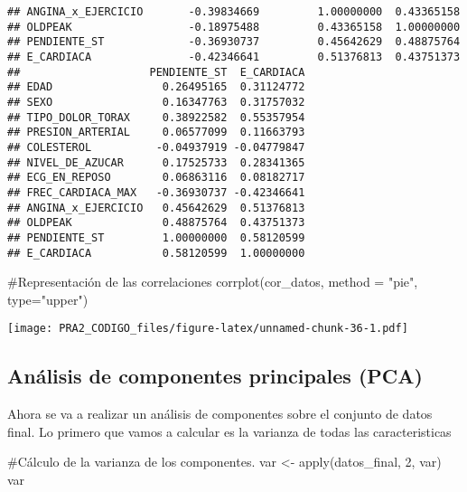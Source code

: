 \documentclass[
]{article}
\newenvironment{Shaded}{\begin{snugshade}}{\end{snugshade}}
\newcommand{\AttributeTok}[1]{\textcolor[rgb]{0.80,0.80,0.80}{#1}}
\newcommand{\CommentTok}[1]{\textcolor[rgb]{0.50,0.62,0.50}{#1}}
\newcommand{\DecValTok}[1]{\textcolor[rgb]{0.86,0.86,0.80}{#1}}
\newcommand{\FunctionTok}[1]{\textcolor[rgb]{0.94,0.94,0.56}{#1}}
\newcommand{\NormalTok}[1]{\textcolor[rgb]{0.80,0.80,0.80}{#1}}
\newcommand{\OtherTok}[1]{\textcolor[rgb]{0.94,0.94,0.56}{#1}}
\newcommand{\StringTok}[1]{\textcolor[rgb]{0.80,0.58,0.58}{#1}}
\begin{document}
\begin{verbatim}
## ANGINA_x_EJERCICIO       -0.39834669         1.00000000  0.43365158
## OLDPEAK                  -0.18975488         0.43365158  1.00000000
## PENDIENTE_ST             -0.36930737         0.45642629  0.48875764
## E_CARDIACA               -0.42346641         0.51376813  0.43751373
##                    PENDIENTE_ST  E_CARDIACA
## EDAD                 0.26495165  0.31124772
## SEXO                 0.16347763  0.31757032
## TIPO_DOLOR_TORAX     0.38922582  0.55357954
## PRESION_ARTERIAL     0.06577099  0.11663793
## COLESTEROL          -0.04937919 -0.04779847
## NIVEL_DE_AZUCAR      0.17525733  0.28341365
## ECG_EN_REPOSO        0.06863116  0.08182717
## FREC_CARDIACA_MAX   -0.36930737 -0.42346641
## ANGINA_x_EJERCICIO   0.45642629  0.51376813
## OLDPEAK              0.48875764  0.43751373
## PENDIENTE_ST         1.00000000  0.58120599
## E_CARDIACA           0.58120599  1.00000000
\end{verbatim}

\begin{Shaded}
\begin{Highlighting}[]
\CommentTok{\#Representación de las correlaciones}
\FunctionTok{corrplot}\NormalTok{(cor\_datos, }\AttributeTok{method =} \StringTok{"pie"}\NormalTok{, }\AttributeTok{type=}\StringTok{"upper"}\NormalTok{)}
\end{Highlighting}
\end{Shaded}

\texttt{[image: PRA2\_CODIGO\_files/figure-latex/unnamed-chunk-36-1.pdf]}

\hypertarget{anuxe1lisis-de-componentes-principales-pca}{%
\subsection{Análisis de componentes principales
(PCA)}\label{anuxe1lisis-de-componentes-principales-pca}}

Ahora se va a realizar un análisis de componentes sobre el conjunto de
datos final. Lo primero que vamos a calcular es la varianza de todas las
caracteristicas

\begin{Shaded}
\begin{Highlighting}[]
\CommentTok{\#Cálculo de la varianza de los componentes.}
\NormalTok{var }\OtherTok{\textless{}{-}} \FunctionTok{apply}\NormalTok{(datos\_final, }\DecValTok{2}\NormalTok{, var)}
\NormalTok{var}
\end{Highlighting}
\end{Shaded}
\end{document}
